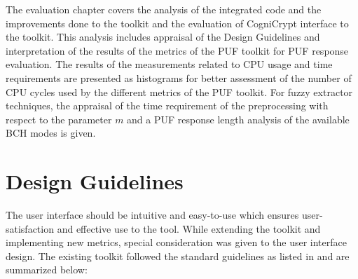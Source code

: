 The evaluation chapter covers the analysis of the integrated code and the improvements done to the toolkit and the evaluation of CogniCrypt interface to the toolkit. This analysis includes appraisal of the Design Guidelines and interpretation of the results of the metrics of the PUF toolkit for PUF response evaluation. The results of the measurements related to CPU usage and time requirements are presented as
histograms for better assessment of the number of CPU cycles used by the different metrics of the PUF toolkit. For fuzzy extractor techniques, the appraisal of the time requirement of the preprocessing  with respect to the parameter $m$ and a PUF response length analysis of the available BCH modes is given.\\

\section{Design Guidelines}
The user interface should be intuitive and easy-to-use which ensures user-satisfaction and effective use to the tool. While extending the toolkit and implementing new metrics, special consideration was given to the user interface design. The existing toolkit followed the standard guidelines as listed in \cite{67} and are summarized below:

